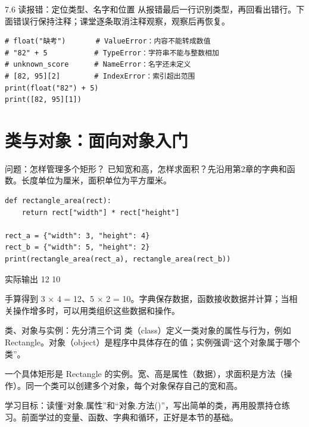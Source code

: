 \documentclass[9pt]{ctexbeamer}
\begin{document}
\begin{frame}[fragile]{7.6 读报错：定位类型、名字和位置}
\small 从报错最后一行识别类型，再回看出错行。下面错误行保持注释；课堂逐条取消注释观察，观察后再恢复。
\medskip
\begin{lstlisting}
# float("缺考")       # ValueError：内容不能转成数值
# "82" + 5           # TypeError：字符串不能与整数相加
# unknown_score      # NameError：名字还未定义
# [82, 95][2]        # IndexError：索引超出范围
print(float("82") + 5)
print([82, 95][1])
\end{lstlisting}
\end{frame}

\section{类与对象：面向对象入门}
\begin{frame}[fragile]{问题：怎样管理多个矩形？}
已知宽和高，怎样求面积？先沿用第2章的字典和函数。长度单位为厘米，面积单位为平方厘米。
\begin{lstlisting}
def rectangle_area(rect):
    return rect["width"] * rect["height"]

rect_a = {"width": 3, "height": 4}
rect_b = {"width": 5, "height": 2}
print(rectangle_area(rect_a), rectangle_area(rect_b))
\end{lstlisting}
\begin{exampleblock}{实际输出}
{\ttfamily\small 12 10}
\end{exampleblock}
\small 手算得到 3 × 4 = 12、5 × 2 = 10。字典保存数据，函数接收数据并计算；当相关操作增多时，可以用类组织这些数据和操作。
\par{}

\end{frame}

\begin{frame}{类、对象与实例：先分清三个词}
类（class）定义一类对象的属性与行为，例如 Rectangle。对象（object）是程序中具体存在的值；实例强调“这个对象属于哪个类”。
\par
一个具体矩形是 Rectangle 的实例。宽、高是属性（数据），求面积是方法（操作）。同一个类可以创建多个对象，每个对象保存自己的宽和高。
\par
学习目标：读懂“对象.属性”和“对象.方法()”，写出简单的类，再用股票持仓练习。前面学过的变量、函数、字典和循环，正好是本节的基础。
\par{}

\end{frame}
\end{document}
